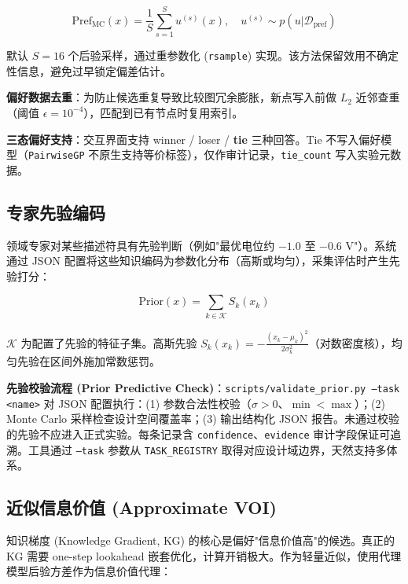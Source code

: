 \documentclass[12pt,a4paper]{article}
\begin{document}
\begin{equation}
    \text{Pref}_{\text{MC}}(x) = \frac{1}{S} \sum_{s=1}^{S} u^{(s)}(x), \quad u^{(s)} \sim p(u | \mathcal{D}_{\text{pref}})
\end{equation}

默认 $S = 16$ 个后验采样，通过重参数化 (\texttt{rsample}) 实现。该方法保留效用不确定性信息，避免过早锁定偏差估计。

\textbf{偏好数据去重}：为防止候选重复导致比较图冗余膨胀，新点写入前做 $L_2$ 近邻查重（阈值 $\epsilon = 10^{-4}$），匹配到已有节点时复用索引。

\textbf{三态偏好支持}：交互界面支持 winner / loser / \textbf{tie} 三种回答。Tie 不写入偏好模型（\texttt{PairwiseGP} 不原生支持等价标签），仅作审计记录，\texttt{tie\_count} 写入实验元数据。

\subsection{专家先验编码}
\label{sec:prior}

领域专家对某些描述符具有先验判断（例如"最优电位约 $-1.0$ 至 $-0.6$ V"）。系统通过 JSON 配置将这些知识编码为参数化分布（高斯或均匀），采集评估时产生先验打分：

\begin{equation}
    \text{Prior}(x) = \sum_{k \in \mathcal{K}} S_k(x_k)
\end{equation}

$\mathcal{K}$ 为配置了先验的特征子集。高斯先验 $S_k(x_k) = -\frac{(x_k - \mu_k)^2}{2\sigma_k^2}$（对数密度核），均匀先验在区间外施加常数惩罚。

\textbf{先验校验流程 (Prior Predictive Check)}：\texttt{scripts/validate\_prior.py --task <name>} 对 JSON 配置执行：(1) 参数合法性校验（$\sigma > 0$、$\min < \max$）；(2) Monte Carlo 采样检查设计空间覆盖率；(3) 输出结构化 JSON 报告。未通过校验的先验不应进入正式实验。每条记录含 \texttt{confidence}、\texttt{evidence} 审计字段保证可追溯。工具通过 \texttt{--task} 参数从 \texttt{TASK\_REGISTRY} 取得对应设计域边界，天然支持多体系。

\subsection{近似信息价值 (Approximate VOI)}
\label{sec:voi}

知识梯度 (Knowledge Gradient, KG)\cite{wu2016kg} 的核心是偏好"信息价值高"的候选。真正的 KG 需要 one-step lookahead 嵌套优化，计算开销极大。作为轻量近似，使用代理模型后验方差作为信息价值代理：
\end{document}
